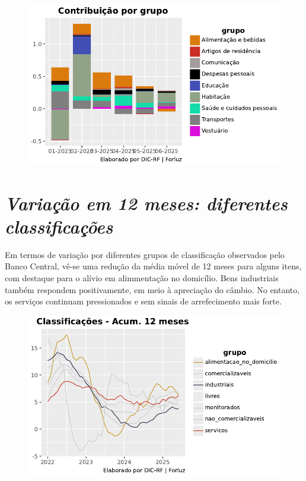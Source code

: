 \documentclass[
  letterpaper,
  DIV=11,
  numbers=noendperiod]{scrartcl}
\begin{document}
\begin{figure}

{\centering \includegraphics{IPCAForluz_files/figure-pdf/cell-7-output-1.pdf}

}

\end{figure}

\hypertarget{variauxe7uxe3o-em-12-meses-diferentes-classificauxe7uxf5es}{%
\section{\texorpdfstring{\emph{Variação em 12 meses: diferentes
classificações}}{Variação em 12 meses: diferentes classificações}}\label{variauxe7uxe3o-em-12-meses-diferentes-classificauxe7uxf5es}}

Em termos de variação por diferentes grupos de classificação observados
pelo Banco Central, vê-se uma redução da média móvel de 12 meses para
alguns itens, com destaque para o alívio em alimmentação no domicílio.
Bens industriais também respondem positivamente, em meio à apreciação do
câmbio. No entanto, os serviços continuam pressionados e sem sinais de
arrefecimento mais forte.

\begin{figure}

{\centering \includegraphics{IPCAForluz_files/figure-pdf/cell-8-output-1.pdf}

}

\end{figure}
\end{document}
